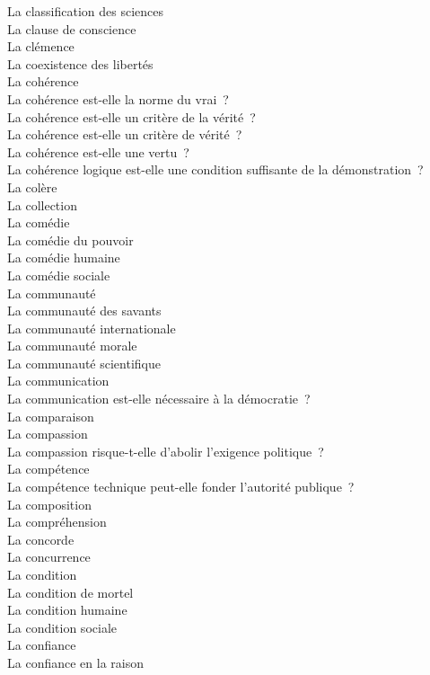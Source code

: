 \documentclass[a4paper,12pt]{article}
\begin{document}
La classification des sciences \\
La clause de conscience \\
La clémence \\
La coexistence des libertés \\
La cohérence \\
La cohérence est-elle la norme du vrai ? \\
La cohérence est-elle un critère de la vérité ? \\
La cohérence est-elle un critère de vérité ? \\
La cohérence est-elle une vertu ? \\
La cohérence logique est-elle une condition suffisante de la démonstration ? \\
La colère \\
La collection \\
La comédie \\
La comédie du pouvoir \\
La comédie humaine \\
La comédie sociale \\
La communauté \\
La communauté des savants \\
La communauté internationale \\
La communauté morale \\
La communauté scientifique \\
La communication \\
La communication est-elle nécessaire à la démocratie ? \\
La comparaison \\
La compassion \\
La compassion risque-t-elle d'abolir l'exigence politique ? \\
La compétence \\
La compétence technique peut-elle fonder l'autorité publique ? \\
La composition \\
La compréhension \\
La concorde \\
La concurrence \\
La condition \\
La condition de mortel \\
La condition humaine \\
La condition sociale \\
La confiance \\
La confiance en la raison \\
\end{document}
